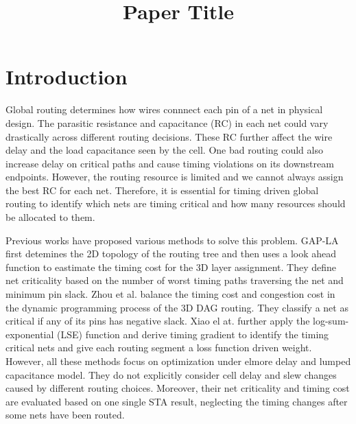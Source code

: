 \documentclass[conference]{IEEEtran}
\begin{document}
\title{Paper Title}

\author{
}

\maketitle

\begin{abstract}
\end{abstract}

\begin{IEEEkeywords}
\end{IEEEkeywords}

\section{Introduction}
\label{sec:introduction}
Global routing determines how wires connnect each pin of a net in physical design. 
The parasitic resistance and capacitance (RC) in each net
could vary drastically across different routing decisions.
These RC further affect the wire delay and the load capacitance seen by the cell.
One bad routing could also increase delay on critical paths and cause timing violations on 
its downstream endpoints. 
However, the routing resource is limited and we cannot always assign 
the best RC for each net. 
Therefore, it is essential for timing driven global routing to identify
which nets are timing critical and how many resources should be allocated to them.

Previous works have proposed various methods to solve this problem. 
GAP-LA \cite{gap-la} first detemines the 2D topology of the routing tree and then 
uses a look ahead function to eastimate the timing cost for the 3D layer assignment.
They define net criticality based on the number of worst timing paths traversing the net and 
minimum pin slack.
Zhou et al. \cite{zhou2026aspdac} balance the timing cost and congestion cost in 
the dynamic programming process of the 3D DAG routing. 
They classify a net as critical if any of its pins has negative slack.
Xiao el at. \cite{xiao2026ispd} 
further apply the log-sum-exponential (LSE) function and derive timing gradient 
to identify the timing critical nets and give each routing segment 
a loss function driven weight. 
However, all these methods focus on optimization under elmore delay and lumped capacitance model. 
They do not explicitly consider cell delay and slew changes caused by different routing choices.  
Moreover, their net criticality and timing cost are evaluated based on one single STA result, neglecting 
the timing changes after some nets have been routed.
\end{document}
